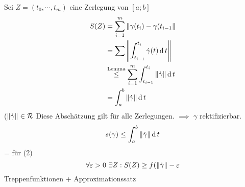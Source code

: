 \begin{Bew}
  Sei $Z=(t_0,\cdots,t_m)$ eine Zerlegung von $[a;b]$    
  \begin{align*}
    S(Z)&=\sum^m_{i=1}\left\| \gamma(t_i)-\gamma(t_{i-1} \right\|\\
    &=\sum\left\| \int^{t_i}_{t_{i-1}}\dot{\gamma}(t)\operatorname{d} t \right\|\\
    &\stackrel{\text{Lemma}}{\leq}\sum^m_{i=1}\int^{t_i}_{t_{i-1}}\left\| \dot{\gamma} \right\|\operatorname{d} t\\
    &=\int^b_a\left\| \dot{\gamma} \right\|\operatorname{d} t    
  \end{align*}
  ($\left\| \dot{\gamma} \right\|\in\mathcal{R}$  Diese Abschätzung gilt für alle Zerlegungen. $\implies$ $\gamma$ rektifizierbar.
  \[s(\gamma)\leq \int^b_a\left\| \dot{\gamma} \right\|\operatorname{d} t\]
  = für (2)
  \[\forall \varepsilon>0\ \exists Z: S(Z)\geq f(\left\| \dot{\gamma} \right\|-\varepsilon\]
  Treppenfunktionen + Approximationssatz
\end{Bew}
